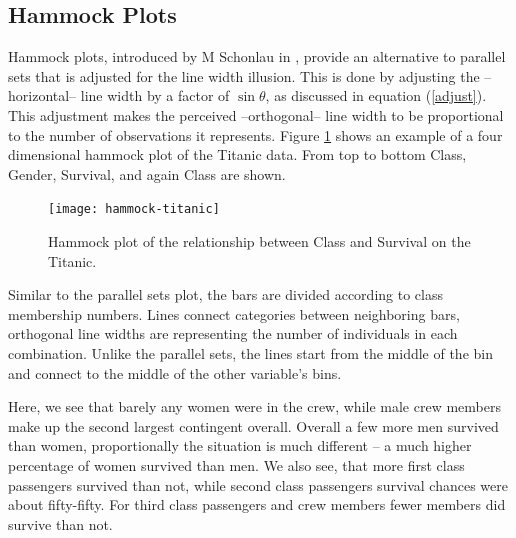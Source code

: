 \subsection{Hammock Plots}

Hammock plots, introduced by M Schonlau in \citep{schonlau:2003}, provide an alternative to parallel sets that is adjusted for the line width illusion. This is done by  adjusting the --horizontal-- line width by  a factor of $\sin \theta$, as discussed in equation (\ref{adjust}). This adjustment makes the perceived --orthogonal-- line width to be proportional to the number of observations it represents. 
 Figure \ref{hammock} shows an example of a four dimensional hammock plot of the Titanic data. From top to bottom Class, Gender, Survival, and again Class are shown. 
\begin{figure}
\centering
\texttt{[image: hammock-titanic]}
\caption{\label{hammock} Hammock plot of the relationship between Class and Survival on the Titanic. }
\end{figure}

Similar to the parallel sets plot, the bars are divided according to class membership numbers.  Lines connect categories between neighboring bars, orthogonal line widths are representing the number of individuals in each combination. Unlike the parallel sets, the lines start from the middle of the bin and connect to the middle of the other variable's bins. 

Here, we see that barely any women were in the crew, while male crew members make up the second largest contingent overall. Overall a few more men survived than women, proportionally the situation is much different -- a much higher percentage of women survived than men. We also see, that more first class passengers survived than not, while second class passengers survival chances were about fifty-fifty. For third class passengers and crew members fewer members did  survive than not. 

